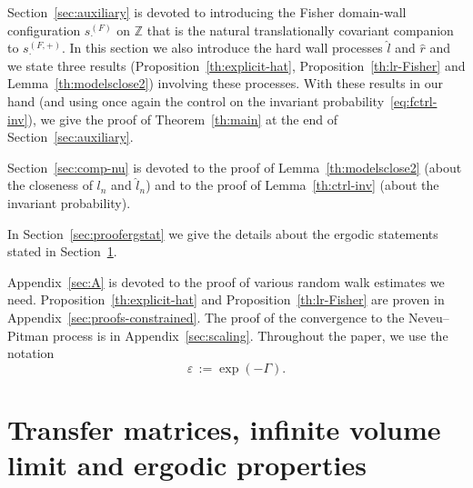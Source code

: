 \documentclass[10pt]{amsart}
\theoremstyle{definition}\newtheorem{defi}[theo]{Definition}\newtheorem{rema}[theo]{Remark}\newtheorem{exam}[theo]{Example}\newtheorem{exem}[theo]{Example}\newtheorem{nota}[theo]{Notation}
\newcommand{\bbZ}{\mathbb{Z}}
\newcommand{\gep}{\varepsilon}
\newcommand{\gG}{\Gamma}
\newcommand{\ls}{\widehat{l}}
\newcommand{\rs}{\widehat{r}}
\begin{document}
Section~\ref{sec:auxiliary} is devoted to introducing the Fisher domain-wall configuration $s^{(F)}_\cdot$ on $\bbZ$ that is the natural translationally covariant companion to $s^{(F, +)}_\cdot$. In this section we also introduce the hard wall processes $ \ls$ and $\rs$ and we state three results (Proposition~\ref{th:explicit-hat}, Proposition~\ref{th:lr-Fisher} and Lemma~\ref{th:modelsclose2}) involving these processes. With these results in our hand (and using once again the control on the invariant probability~\eqref{eq:fctrl-inv}), we give the proof of Theorem~\ref{th:main} at the end of Section~\ref{sec:auxiliary}.

Section~\ref{sec:comp-nu} is devoted to the proof of Lemma~\ref{th:modelsclose2} (about the closeness of $l_n$ and $\ls_n$) and to the proof of Lemma~\ref{th:ctrl-inv} (about the invariant probability).

In Section~\ref{sec:proofergstat} we give the details about the ergodic statements stated in Section~\ref{sec:tm-mainproof}.

Appendix~\ref{sec:A} is devoted to the proof of various random walk estimates we need. Proposition~\ref{th:explicit-hat} and Proposition~\ref{th:lr-Fisher} are proven in Appendix~\ref{sec:proofs-constrained}. The proof of the convergence to the Neveu--Pitman process is in Appendix~\ref{sec:scaling}. Throughout the paper, we use the notation
\begin{equation}\label{eq:epsilon}
\gep\,:= \exp(-\gG).
\end{equation}



\section{Transfer matrices, infinite volume limit and ergodic properties}\label{sec:tm-mainproof}
\end{document}
